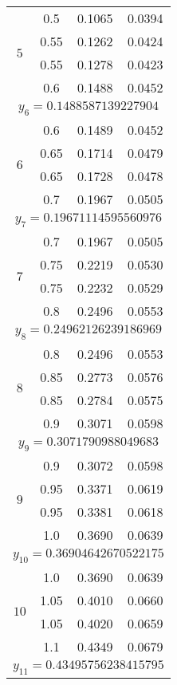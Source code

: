 \begin{longtable}{|c|c|c|c|}
\multirow{4}{*}{$5$}
&0.5 &0.1065 &0.0394 \\ \cline{2-4}
&0.55 &0.1262 &0.0424 \\ \cline{2-4}
&0.55 &0.1278 &0.0423 \\ \cline{2-4}
&0.6 &0.1488 &0.0452 \\ \hline
\multicolumn{4}{|c|}{$y_6 = 0.1488587139227904$} \\ \hline

\multirow{4}{*}{$6$}
&0.6 &0.1489 &0.0452 \\ \cline{2-4}
&0.65 &0.1714 &0.0479 \\ \cline{2-4}
&0.65 &0.1728 &0.0478 \\ \cline{2-4}
&0.7 &0.1967 &0.0505 \\ \hline
\multicolumn{4}{|c|}{$y_7 = 0.19671114595560976$} \\ \hline

\multirow{4}{*}{$7$}
&0.7 &0.1967 &0.0505 \\ \cline{2-4}
&0.75 &0.2219 &0.0530 \\ \cline{2-4}
&0.75 &0.2232 &0.0529 \\ \cline{2-4}
&0.8 &0.2496 &0.0553 \\ \hline
\multicolumn{4}{|c|}{$y_8 = 0.24962126239186969$} \\ \hline

\multirow{4}{*}{$8$}
&0.8 &0.2496 &0.0553 \\ \cline{2-4}
&0.85 &0.2773 &0.0576	 \\ \cline{2-4}
&0.85 &0.2784 &0.0575 \\ \cline{2-4}
&0.9 &0.3071 &0.0598 \\ \hline
\multicolumn{4}{|c|}{$y_9 = 0.3071790988049683$} \\ \hline

\multirow{4}{*}{$9$}
&0.9 &0.3072 &0.0598 \\ \cline{2-4}
&0.95 &0.3371 &0.0619 \\ \cline{2-4}
&0.95 &0.3381 &0.0618 \\ \cline{2-4}
&1.0 &0.3690 &0.0639 \\ \hline
\multicolumn{4}{|c|}{$y_{10} = 0.36904642670522175$} \\ \hline

\multirow{4}{*}{$10$}
&1.0 &0.3690 &0.0639 \\ \cline{2-4}
&1.05 &0.4010 &0.0660 \\ \cline{2-4}
&1.05 &0.4020 &0.0659 \\ \cline{2-4}
&1.1 &0.4349 &0.0679 \\ \hline
\multicolumn{4}{|c|}{$y_{11} = 0.43495756238415795$} \\ \hline


\end{longtable}

